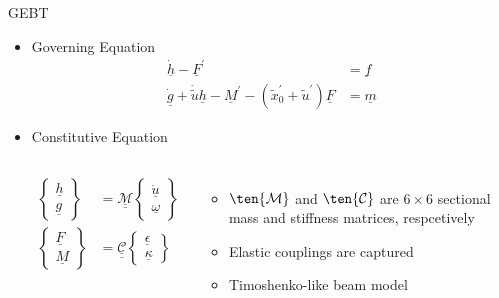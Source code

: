 \documentclass[dvips,xcolor=cmyk]{beamer}
\begin{document}
\begin{frame}{GEBT}
\begin{itemize}
    \item Governing Equation
      \begin{align*} 
      \dot{\underline{h}} - \underline{F}^\prime &= \underline{f} \\
      \dot{\underline{g}} + \dot{\widetilde{u}} \underline{h} -
      \underline{M}^\prime - (\widetilde{x}_0^\prime + \widetilde{u}^\prime) \underline{F}
      &= \underline{m} 
      \end{align*}
    
    \item Constitutive Equation
    \begin{columns}[c]
      \column{2.0 in}
      
      \begin{align*}
      \begin{Bmatrix} \underline{h} \\ \underline{g} \end{Bmatrix} &=
      \underline{\underline{\mathcal{M}}} \begin{Bmatrix} \dot{\underline{u}} \\
      \underline{\omega} \end{Bmatrix} \\
      \begin{Bmatrix} \underline{F} \\ \underline{M} \end{Bmatrix} &=
      \underline{\underline{\mathcal{C}}} \begin{Bmatrix} \underline{\epsilon} \\
      \underline{\kappa} \end{Bmatrix} 
      \end{align*}
      \column{2.0 in}
      \begin{itemize}
        \scriptsize
        \pause
        \item
        $\ten{\mathcal{M}}$ and $\ten{\mathcal{C}}$ are $6 \times 6$ sectional mass and stiffness matrices, respcetively \pause
        \item
        Elastic couplings are captured \pause
        \item
        Timoshenko-like beam model
      \end{itemize}
      
      \end{columns}


\end{itemize}
\end{frame}
\end{document}
